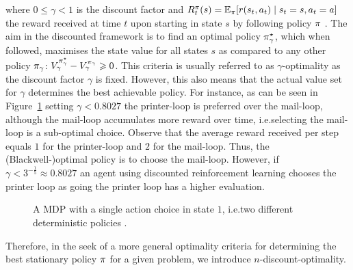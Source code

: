 \documentclass[envcountsame]{llncs}
\begin{document}
where \(0 \leqslant \gamma < 1\) is the discount factor and
\(R_{t}^{\pi}(s) = \operatorname*{\mathbb{E}}_{\pi}[ r(s_{t},a_{t}) \mid s_{t} = s, a_{t} = a]\) the reward received at
time \(t\) upon starting in state \(s\) by following policy \(\pi\)
\citep{Mahadevan96_AverageRewardReinforcementLearningFoundationsAlgorithmsAndEmpiricalResults}.
%
The aim in the discounted framework is to find an optimal policy \(\pi^{\star}_{\gamma}\), which when
followed, maximises the state value for all states \(s\) as compared to any other policy
\(\pi_{\gamma}\): \(V_{\gamma}^{\pi^{\star}_{\gamma}} - V_{\gamma}^{\pi_{\gamma}} \geqslant 0\). This
criteria is usually referred to as \(\gamma\)-optimality as the discount factor \(\gamma\) is fixed.
However, this also means that the actual value set for \(\gamma\) determines the best achievable
policy. For instance, as can be seen in Figure~\ref{fig:printer} setting \(\gamma <0.8027\) the
printer-loop is preferred over the mail-loop, although the mail-loop accumulates more
reward over time, i.e.\@ selecting the mail-loop is a sub-optimal choice. Observe that the average
reward received per step equals \(1\) for the printer-loop and \(2\) for the mail-loop. Thus, the
(Blackwell-)optimal policy is to choose the mail-loop. However, if
\(\gamma < 3^{-\frac{1}{5}} \approx 0.8027\) an agent using discounted reinforcement learning
chooses the printer loop as going the printer loop has a higher evaluation.
%
\begin{figure}[t!]
  \centering
  
  \caption{\label{fig:printer} A MDP with a single action choice in
    state \(1\), i.e.\@ two different deterministic policies
    \citep[][adapted]{Mahadevan96_OptimalityCriteriaInReinforcementLearning}.
  }
\end{figure}
%

Therefore, in the seek of a more general optimality criteria for determining the best stationary
policy \(\pi\) for a given problem, we introduce \(n\)-discount-optimality.


\end{document}
